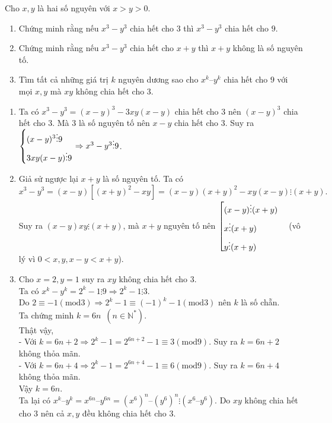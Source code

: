 \begin{ex}%
Cho $x, y$ là hai số nguyên với $x>y>0$.
    \begin{enumerate}    
        \item Chứng minh rằng nếu $x^3-y^3$ chia hết cho $3$ thì $x^3-y^3$ chia hết cho $9$.
        \item Chứng minh rằng nếu $x^3-y^3$ chia hết cho $x+y$ thì $x+y$ không là số nguyên tố.
\item Tìm tất cả những giá trị $k$ nguyên dương sao cho $x^k –y^k$ chia hết cho $9$ với mọi $x, y$ mà $xy$ không chia hết cho $3$.
    \end{enumerate}
\loigiai
    {
    \begin{enumerate}
        \item Ta có $x^3-y^3=(x-y)^3-3xy(x-y)$ chia hết cho $3$ nên $(x-y)^3$ chia hết cho $3$. Mà $3$ là số nguyên tố nên $x-y$ chia hết cho $3$. Suy ra $\left\{\begin{aligned}& (x-y)^3 \vdots 9 \\ & 3xy(x-y) \vdots 9\end{aligned}\right. \Rightarrow x^3-y^3 \vdots 9$.
        \item Giả sử ngược lại $x+y$ là số nguyên tố. Ta có
\[x^3-y^3=(x-y)\left[ (x+y)^2-xy \right]=(x-y)(x+y)^2-xy(x-y) \vdots (x+y).\]
Suy ra $(x-y)xy \vdots (x+y)$, mà $x+y$ nguyên tố nên $\left[\begin{aligned}& (x-y) \vdots (x+y) \\ & x \vdots (x+y) \\ & y \vdots (x+y)\end{aligned}\right.$ \,\,\, (vô lý vì $0 < x, y, x-y < x+y$).
\item  Cho $x=2, y=1$ suy ra $xy$ không chia hết cho $3$.\\
Ta có $x^k - y^k=2^k-1 \vdots 9 \Rightarrow 2^k -1 \vdots 3$.\\
Do $2 \equiv -1 (\text{mod} 3) \Rightarrow 2^k-1 \equiv  (-1)^k-1 (\text{mod} 3) $ nên $k$ là số chẵn. \\
Ta chứng minh $k=6n \,\,\, (n \in \mathbb{N}^*)$.\\
Thật vậy, \\
-	Với $k=6n+2 \Rightarrow 2^k -1 = 2^{6n+2}-1 \equiv 3 (\text{mod} 9) $. Suy ra $k=6n+2$ không thỏa mãn.\\
-	Với $k=6n+4 \Rightarrow 2^k -1 = 2^{6n+4}-1 \equiv 6 (\text{mod} 9) $. Suy ra $k=6n+4$ không thỏa mãn.\\
Vậy $k=6n$. \\
Ta lại có $x^k – y^k=x^{6n} – y^{6n}=(x^6)^n – (y^6)^n \vdots (x^6 – y^6)$. Do $xy$ không chia hết cho $3$ nên cả $x, y$ đều không chia hết cho $3$.\\

\end{enumerate}}
\end{ex}
